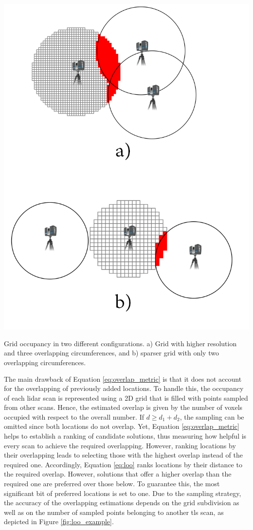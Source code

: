 \begin{marginfigure}[-8.0cm]
    \centering
    \includegraphics[width=\linewidth]{figs/lidar_optimization/loo.png}
	\caption{Grid occupancy in two different configurations. a) Grid with higher resolution and three overlapping circumferences, and b) sparser grid with only two overlapping circumferences.}
	\label{fig:loo_example}
\end{marginfigure}
The main drawback of Equation \ref{eq:overlap_metric} is that it does not account for the overlapping of previously added locations. To handle this, the occupancy of each \acrshort{lidar} scan is represented using a 2D grid that is filled with points sampled from other scans. Hence, the estimated overlap is given by the number of voxels occupied with respect to the overall number. If $d \geq d_1 + d_2$, the sampling can be omitted since both locations do not overlap. Yet, Equation \ref{eq:overlap_metric} helps to establish a ranking of candidate solutions, thus measuring how helpful is every scan to achieve the required overlapping. However, ranking locations by their overlapping leads to selecting those with the highest overlap instead of the required one. Accordingly, Equation \ref{eq:loo} ranks locations by their distance to the required overlap. However, solutions that offer a higher overlap than the required one are preferred over those below. To guarantee this, the most significant bit of preferred locations is set to one. Due to the sampling strategy, the accuracy of the overlapping estimations depends on the grid subdivision as well as on the number of sampled points belonging to another \acrshort{tls} scan, as depicted in Figure \ref{fig:loo_example}.
